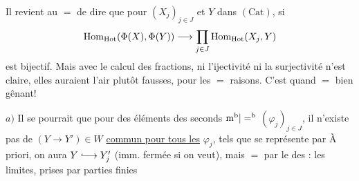 
Il revient au $=$ de dire que pour $(X_j)_{j\in J}$ et $Y$ dans $(\mathrm{Cat})$, si 
\[
\operatorname{Hom}_{\mathrm{Hot}}(\Phi(X),\Phi(Y))\longrightarrow\prod_{j\in J}\operatorname{Hom}_{\mathrm{Hot}}(X_j,Y)
\]
est bijectif. Mais avec le calcul des fractions, ni l'ijectivité ni la surjectivité n'est claire, elles auraient l'air plutôt fausses, pour les $=$ raisons. C'est quand $=$ bien gênant! 

$a)$ Il se pourrait que pour des  éléments des seconds $\mathrm m^{\mathrm b}|=^{\mathrm b}$ $(\varphi_j)_{j\in J}$, il n'existe pas de $(Y\longrightarrow Y')\in W$ \uline{commun pour tous les} $\varphi_j$, tels que
se représente par
À priori, on aura $Y\lhook\joinrel\longrightarrow Y'_j$ (imm. fermée si on veut), mais  $=$ par le  des : les limites, prises par parties finies
